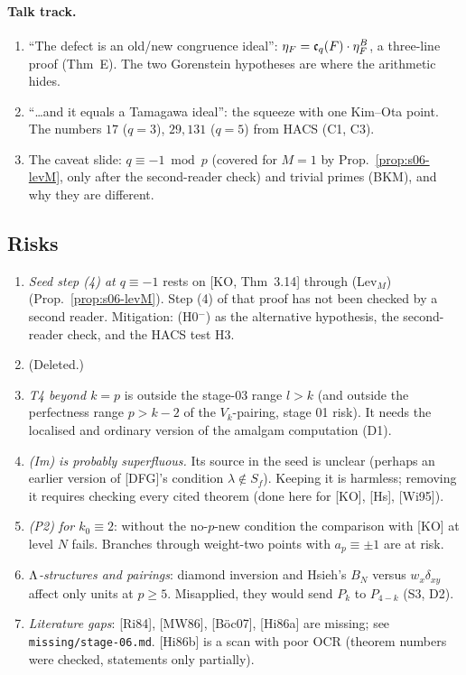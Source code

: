 \paragraph{Talk track.}
\begin{enumerate}[label=K\arabic*.]
\item ``The defect is an old/new congruence ideal'': $\eta_F=\mathfrak{c}_q(F)\cdot\eta^B_F$, a three-line proof (Thm~E). The two Gorenstein
  hypotheses are where the arithmetic hides.
\item ``\dots and it equals a Tamagawa ideal'': the squeeze with one Kim--Ota point. The numbers $17$ ($q=3$), $29,131$ ($q=5$) from
  HACS (C1, C3).
\item The caveat slide: $q\equiv-1\bmod p$ (covered for $M=1$ by Prop.~\ref{prop:s06-levM}, only after the second-reader check)
  and trivial primes (BKM), and why they are different. 
\end{enumerate}

\subsection{Risks}
\begin{enumerate}[label=R\arabic*.]
\item \emph{Seed step (4) at $q\equiv-1$} rests on [KO, Thm~3.14] through (Lev$_M$) (Prop.~\ref{prop:s06-levM}). Step (4) of that
  proof has not been checked by a second reader. Mitigation: (H0$^-$) as the alternative hypothesis, the second-reader check, and
  the HACS test H3. 
\item (Deleted.) 
\item \emph{T4 beyond $k=p$} is outside the stage-03 range $l>k$ (and outside the perfectness range $p>k-2$ of the $V_k$-pairing,
  stage 01 risk). It needs the localised and ordinary version of the amalgam computation (D1).
\item \emph{(Im) is probably superfluous.} Its source in the seed is unclear (perhaps an earlier version of [DFG]'s condition $\lambda\notin
  S_f$). Keeping it is harmless; removing it requires checking every cited theorem (done here for [KO], [Hs], [Wi95]).
\item \emph{(P2) for $k_0\equiv2$}: without the no-$p$-new condition the comparison with [KO] at level $N$ fails. Branches through
  weight-two points with $a_p\equiv\pm1$ are at risk.
\item \emph{$\Lambda$-structures and pairings}: diamond inversion and Hsieh's $B_N$ versus $w_x\delta_{xy}$ affect only units at
  $p\ge5$. Misapplied, they would send $P_k$ to $P_{4-k}$ (S3, D2).
\item \emph{Literature gaps}: [Ri84], [MW86], [Böc07], [Hi86a] are missing; see \texttt{missing/stage-06.md}.
  [Hi86b] is a scan with poor OCR (theorem numbers were checked, statements only partially).
\end{enumerate}
